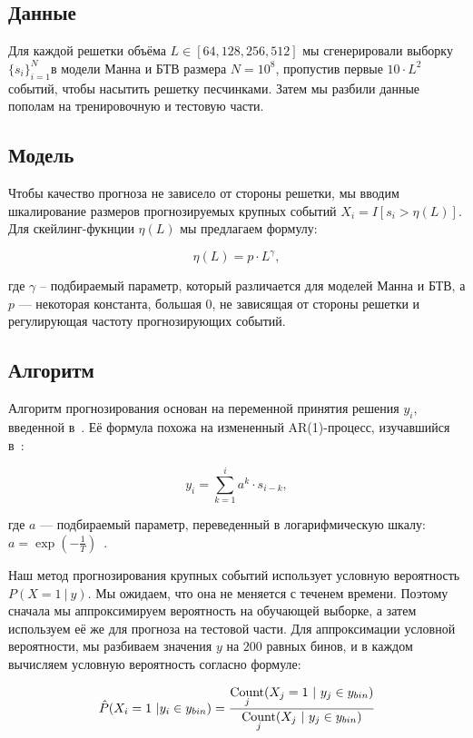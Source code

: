 \subsection{Данные}
Для каждой решетки объёма $L \in [64, 128, 256, 512]$ мы сгенерировали выборку $\{s_i\}_{i=1}^{N}$в модели Манна и БТВ размера $N=10^8$, пропустив первые $10 \cdot L^2$ событий, чтобы насытить решетку песчинками. Затем мы разбили данные пополам на тренировочную и тестовую части.

\subsection{Модель}
Чтобы качество прогноза не зависело от стороны решетки, мы вводим шкалирование размеров прогнозируемых крупных событий $X_i = I[s_i > \eta(L)]$. Для скейлинг-фукнции $\eta(L)$ мы предлагаем формулу:

$$ \eta(L) = p \cdot L^\gamma, $$

\noindent где $\gamma$ -- подбираемый параметр, который различается для моделей Манна и БТВ, а $p$ --- некоторая константа, большая $0$, не зависящая от стороны решетки и регулирующая частоту прогнозирующих событий.

\subsection{Алгоритм}

Алгоритм прогнозирования основан на переменной принятия решения $y_i$, введенной в~\cite{Hallerberg2009,Kantz2010}. Её формула похожа на измененный AR(1)-процесс, изучавшийся в~\cite{Lewis1985}:

$$y_i = \sum\limits_{k=1}^{i} a^k \cdot s_{i-k}, $$

\noindent где $a$ --- подбираемый параметр, переведенный в логарифмическую шкалу: $a = \exp\left(-\frac{1}{T}\right)$~\cite{Hallerberg2009}.

Наш метод прогнозирования крупных событий использует условную вероятность $P(X=1\ |\ y)$. Мы ожидаем, что она не меняется с теченем времени. Поэтому сначала мы аппроксимируем вероятность на обучающей выборке, а затем используем её же для прогноза на тестовой части. Для аппроксимации условной вероятности, мы разбиваем значения $y$ на $200$ равных бинов, и в каждом вычисляем условную вероятность согласно формуле:

$$ \hat{P}(X_i = 1\ | y_i \in y_{bin}) = \frac{\operatorname*{Count}\limits_{j}(X_j = 1\ |\ y_{j} \in y_{bin})}{\operatorname*{Count}\limits_{j}(X_j\ |\ y_{j} \in y_{bin})} $$

